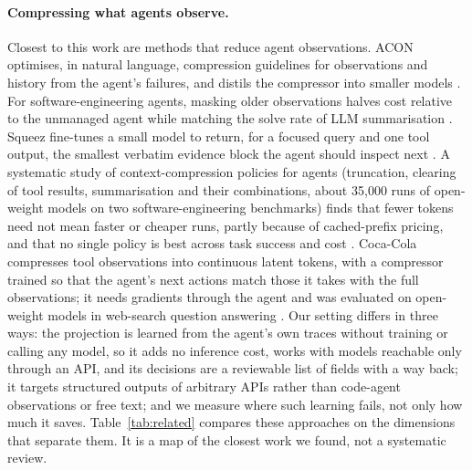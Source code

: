 \paragraph{Compressing what agents observe.} Closest to this work are methods that reduce agent observations.
ACON optimises, in natural language, compression guidelines for observations and history from the agent's
failures, and distils the compressor into smaller models \citep{kang2026acon}. For software-engineering agents,
masking older observations halves cost relative to the unmanaged agent while matching the solve rate of LLM
summarisation \citep{lindenbauer2025complexity}. Squeez
fine-tunes a small model to return, for a focused query and one tool output, the smallest verbatim evidence block
the agent should inspect next \citep{kovacs2026squeez}. A systematic study of context-compression policies
for agents (truncation, clearing of tool results, summarisation and their combinations, about 35{,}000 runs of
open-weight models on two software-engineering benchmarks) finds that fewer tokens need not mean faster or cheaper
runs, partly because of cached-prefix pricing, and that no single policy is best across task success and cost
\citep{satish2026beyond}. Coca-Cola compresses tool observations into continuous latent tokens, with a compressor
trained so that the agent's next actions match those it takes with the full observations; it needs gradients through
the agent and was evaluated on open-weight models in web-search question answering \citep{liu2026tools}. Our setting
differs in three ways: the projection is learned from the agent's own traces without training or calling any model,
so it adds no inference cost, works with models reachable only through an API, and its decisions are a reviewable
list of fields with a way back; it targets structured outputs of arbitrary APIs rather than code-agent observations
or free text; and we measure where such learning fails, not only how much it saves. Table~\ref{tab:related}
compares these approaches on the dimensions that separate them. It is a map of the closest work we found, not a
systematic review.

